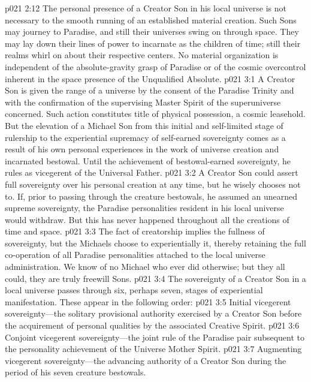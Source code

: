 \vs p021 2:12 The personal presence of a Creator Son in his local universe is not necessary to the smooth running of an established material creation. Such Sons may journey to Paradise, and still their universes swing on through space. They may lay down their lines of power to incarnate as the children of time; still their realms whirl on about their respective centers. No material organization is independent of the absolute\hyp{}gravity grasp of Paradise or of the cosmic overcontrol inherent in the space presence of the Unqualified Absolute.\plusone
{}
\vs p021 3:1 A Creator Son is given the range of a universe by the consent of the Paradise Trinity and with the confirmation of the supervising Master Spirit of the superuniverse concerned. Such action constitutes title of physical possession, a cosmic leasehold. But the elevation of a Michael Son from this initial and self\hyp{}limited stage of rulership to the experiential supremacy of self\hyp{}earned sovereignty comes as a result of his own personal experiences in the work of universe creation and incarnated bestowal. Until the achievement of bestowal\hyp{}earned sovereignty, he rules as vicegerent of the Universal Father.\plusone
\pc \vs p021 3:2 A Creator Son could assert full sovereignty over his personal creation at any time, but he wisely chooses not to. If, prior to passing through the creature bestowals, he assumed an unearned supreme sovereignty, the Paradise personalities resident in his local universe would withdraw. But this has never happened throughout all the creations of time and space.
\vs p021 3:3 The fact of creatorship implies the fullness of sovereignty, but the Michaels choose to experientially  it, thereby retaining the full co\hyp{}operation of all Paradise personalities attached to the local universe administration. We know of no Michael who ever did otherwise; but they all could, they are truly freewill Sons.
\pc \vs p021 3:4 The sovereignty of a Creator Son in a local universe passes through six, perhaps seven, stages of experiential manifestation. These appear in the following order:
\pc \vs p021 3:5 \bibnobreakspace Initial vicegerent sovereignty---the solitary provisional authority exercised by a Creator Son before the acquirement of personal qualities by the associated Creative Spirit.
\pc \vs p021 3:6 \bibnobreakspace Conjoint vicegerent sovereignty---the joint rule of the Paradise pair subsequent to the personality achievement of the Universe Mother Spirit.
\pc \vs p021 3:7 \bibnobreakspace Augmenting vicegerent sovereignty---the advancing authority of a Creator Son during the period of his seven creature bestowals.
